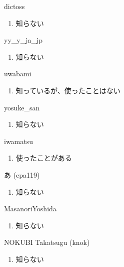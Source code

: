 \begin{prework}{ dictoss }
  \begin{enumerate}
  \item 知らない
  \end{enumerate}
\end{prework}

\begin{prework}{ yy\_y\_ja\_jp }
  \begin{enumerate}
  \item 知らない
  \end{enumerate}
\end{prework}

\begin{prework}{ uwabami }
  \begin{enumerate}
  \item 知っているが、使ったことはない
  \end{enumerate}
\end{prework}

\begin{prework}{ yosuke\_san }
  \begin{enumerate}
  \item 知らない
  \end{enumerate}
\end{prework}

\begin{prework}{ iwamatsu }
  \begin{enumerate}
  \item 使ったことがある
  \end{enumerate}
\end{prework}

\begin{prework}{ あ (cpa119) }
  \begin{enumerate}
  \item 知らない
  \end{enumerate}
\end{prework}

\begin{prework}{ MasanoriYoshida }
  \begin{enumerate}
  \item 知らない
  \end{enumerate}
\end{prework}

\begin{prework}{ NOKUBI Takatsugu (knok) }
  \begin{enumerate}
  \item 知らない
  \end{enumerate}
\end{prework}

